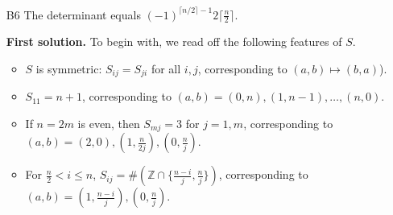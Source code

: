 \documentclass[amssymb,twocolumn,pra,10pt,aps]{revtex4-1}
\newcommand{\ZZ}{\mathbb{Z}}
\begin{document}
\begin{itemize}
\begin{proof}
We next check the ``if'' direction. We may partition the cycles of $\sigma$ into individual cycles of odd length and pairs of cycles of the same even length; then we may argue as above to write each partition as the square of another permutation.
\end{proof}

Suppose now that $n>1$ is odd. Write $n = p^e k$ where $p$ is an odd prime, $k$ is a positive integer, and $\gcd(p,k) = 1$. 
By the Chinese remainder theorem, we have a ring isomorphism 
\[
\ZZ/n\ZZ \cong \ZZ/p^e \ZZ \times \ZZ/k \ZZ.
\]
Recall that the group $(\ZZ/p^e \ZZ)^\times$ is cyclic; choose $m \in \ZZ$ reducing to a generator of $(\ZZ/p^e \ZZ)^\times$ and to the identity in $(\ZZ/k\ZZ)^\times$. Then $\sigma_{n,m}$ consists of $k$ cycles (an odd number) of length $p^{e-1}(p-1)$ (an even number) plus some shorter cycles. By Lemma~\ref{lem:2023B5-2}, $\sigma_{n,m}$ does not have a square root.

Suppose next that $n \equiv 2 \pmod{4}$. Write $n = 2k$ with $k$ odd, so that 
\[
\ZZ/n\ZZ \cong \ZZ/2\ZZ \times \ZZ/k\ZZ.
\]
Then $\sigma_{n,m}$ acts on $\{0\} \times \ZZ/k\ZZ$ and $\{1\} \times \ZZ/k\ZZ$ with the same cycle structure, so every cycle length occurs an even number of times. By Lemma~\ref{lem:2023B5-2}, $\sigma_{n,m}$ has a square root.

Finally, suppose that $n$ is divisible by 4. For $m = -1$, $\sigma_{n,m}$ consists of two fixed points ($0$ and $n/2$) together with $n/2-1$ cycles (an odd number) of length 2 (an even number). 
By Lemma~\ref{lem:2023B5-2}, $\sigma_{n,m}$ does not have a square root.

\item[B6]
The determinant equals $(-1)^{\lceil n/2 \rceil-1} 2 \lceil \frac{n}{2} \rceil$.

\noindent
\textbf{First solution.}
To begin with, we read off the following features of $S$.
\begin{itemize}
\item
$S$ is symmetric: $S_{ij} = S_{ji}$ for all $i,j$, corresponding to $(a,b) \mapsto (b,a)$).
\item
$S_{11} = n+1$, corresponding to $(a,b) = (0,n),(1,n-1),\dots,(n,0)$.
\item
If $n = 2m$ is even, then $S_{mj} = 3$ for $j=1,m$, corresponding to $(a,b) = (2,0),(1,\frac{n}{2j}),(0,\frac{n}{j})$.
\item
For $\frac{n}{2} < i \leq n$, $S_{ij} = \# (\ZZ \cap \{\frac{n-i}{j}, \frac{n}{j}\})$, corresponding to $(a,b) = (1, \frac{n-i}{j}), (0, \frac{n}{j})$.
\end{itemize}


\end{itemize}
\end{document}
